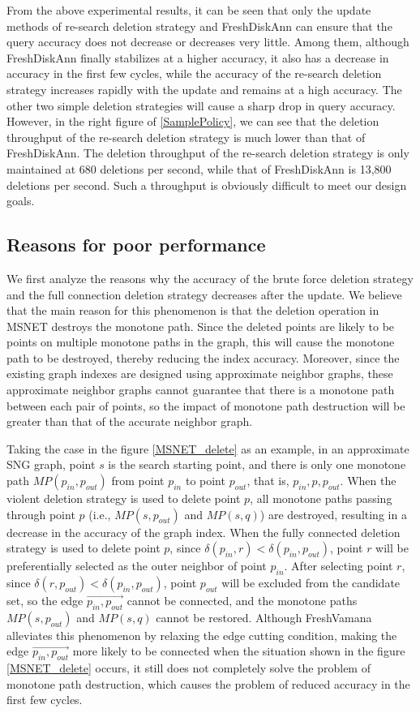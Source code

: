 From the above experimental results, it can be seen that only the update methods of re-search deletion strategy and FreshDiskAnn can ensure that the query accuracy does not decrease or decreases very little. Among them, although FreshDiskAnn finally stabilizes at a higher accuracy, it also has a decrease in accuracy in the first few cycles, while the accuracy of the re-search deletion strategy increases rapidly with the update and remains at a high accuracy. The other two simple deletion strategies will cause a sharp drop in query accuracy. However, in the right figure of \ref{SamplePolicy}, we can see that the deletion throughput of the re-search deletion strategy is much lower than that of FreshDiskAnn. The deletion throughput of the re-search deletion strategy is only maintained at 680 deletions per second, while that of FreshDiskAnn is 13,800 deletions per second. Such a throughput is obviously difficult to meet our design goals.

\subsection{Reasons for poor performance}
We first analyze the reasons why the accuracy of the brute force deletion strategy and the full connection deletion strategy decreases after the update. We believe that the main reason for this phenomenon is that the deletion operation in MSNET destroys the monotone path. Since the deleted points are likely to be points on multiple monotone paths in the graph, this will cause the monotone path to be destroyed, thereby reducing the index accuracy. Moreover, since the existing graph indexes are designed using approximate neighbor graphs, these approximate neighbor graphs cannot guarantee that there is a monotone path between each pair of points, so the impact of monotone path destruction will be greater than that of the accurate neighbor graph.

Taking the case in the figure \ref{MSNET_delete} as an example, in an approximate SNG graph, point $s$ is the search starting point, and there is only one monotone path $MP(p_{in},p_{out})$ from point $p_{in}$ to point $p_{out}$, that is, $p_{in}, p, p_{out}$. When the violent deletion strategy is used to delete point $p$, all monotone paths passing through point $p$ (i.e., $MP(s,p_{out})$ and $MP(s,q)$) are destroyed, resulting in a decrease in the accuracy of the graph index. When the fully connected deletion strategy is used to delete point $p$, since $\delta(p_{in},r)<\delta(p_{in},p_{out})$, point $r$ will be preferentially selected as the outer neighbor of point $p_{in}$. After selecting point $r$, since $\delta(r,p_{out})<\delta(p_{in},p_{out})$, point $p_{out}$ will be excluded from the candidate set, so the edge $\overrightarrow{p_{in},p_{out}}$ cannot be connected, and the monotone paths $MP(s,p_{out})$ and $MP(s,q)$ cannot be restored. Although FreshVamana alleviates this phenomenon by relaxing the edge cutting condition, making the edge $\overrightarrow{p_{in},p_{out}}$ more likely to be connected when the situation shown in the figure \ref{MSNET_delete} occurs, it still does not completely solve the problem of monotone path destruction, which causes the problem of reduced accuracy in the first few cycles.


